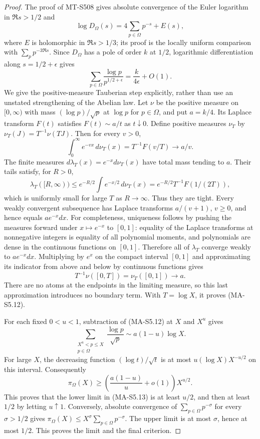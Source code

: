 \begin{proof}
The proof of MT-S508 gives absolute convergence of the Euler
logarithm in $\Re s>1/2$ and
\[
 \log D_\Omega(s)=4\sum_{p\in\Omega}p^{-s}+E(s),
\]
where $E$ is holomorphic in $\Re s>1/3$; its proof is the
locally uniform comparison with $\sum_p p^{-3\Re s}$. Since
$D_\Omega$ has a pole of order $k$ at $1/2$, logarithmic
differentiation along $s=1/2+\epsilon$ gives
\[
 \sum_{p\in\Omega}\frac{\log p}{p^{1/2+\epsilon}}
                  =\frac{k}{4\epsilon}+O(1).
 \tag{MA-S5.14}
\]
We give the positive-measure Tauberian step explicitly, rather
than use an unstated strengthening of the Abelian law.
Let $\nu$ be the positive measure on $[0,\infty)$ with mass
$(\log p)/\sqrt p$ at $\log p$ for $p\in\Omega$, and put
$a=k/4$. Its Laplace transform $F(t)$ satisfies
$F(t)\sim a/t$ as $t\downarrow0$. Define positive measures
$\nu_T$ by $\nu_T(J)=T^{-1}\nu(TJ)$. Then for every $v>0$,
\[
       \int_0^\infty e^{-v x}\,d\nu_T(x)
            =T^{-1}F(v/T)\longrightarrow a/v.
\]
The finite measures $d\lambda_T(x)=e^{-x}d\nu_T(x)$ have
total mass tending to $a$. Their tails satisfy, for $R>0$,
\[
 \lambda_T([R,\infty))
   \le e^{-R/2}\int e^{-x/2}\,d\nu_T(x)
   =e^{-R/2}T^{-1}F(1/(2T)),
\]
which is uniformly small for large $T$ as $R\to\infty$.
Thus they are tight. Every weakly convergent subsequence has
Laplace transforms $a/(v+1)$, $v\ge0$, and hence equals
$a e^{-x}dx$. For completeness, uniqueness follows by pushing
the measures forward under $x\mapsto e^{-x}$ to $[0,1]$:
equality of the Laplace transforms at nonnegative integers is
equality of all polynomial moments, and polynomials are dense
in the continuous functions on $[0,1]$. Therefore all of
$\lambda_T$ converge weakly to $a e^{-x}dx$.
Multiplying by $e^x$ on the compact interval $[0,1]$ and
approximating its indicator from above and below by continuous
functions gives
\[
           T^{-1}\nu([0,T])=\nu_T([0,1])\longrightarrow a.
\]
There are no atoms at the endpoints in the limiting measure,
so this last approximation introduces no boundary term. With
$T=\log X$, it proves (MA-S5.12).

For each fixed $0<u<1$, subtraction of (MA-S5.12) at $X$ and
$X^u$ gives
\[
 \sum_{\substack{X^u<p\le X\\p\in\Omega}}
       \frac{\log p}{\sqrt p}
              \sim a(1-u)\log X.
\]
For large $X$, the decreasing function $(\log t)/\sqrt t$
is at most $u(\log X)X^{-u/2}$ on this interval. Consequently
\[
 \pi_\Omega(X)\ge
     \left(\frac{a(1-u)}u+o(1)\right)X^{u/2}.
\]
This proves that the lower limit in (MA-S5.13) is at least
$u/2$, and then at least $1/2$ by letting $u\uparrow1$.
Conversely, absolute convergence of
$\sum_{p\in\Omega}p^{-\sigma}$ for every $\sigma>1/2$
gives $\pi_\Omega(X)\le X^\sigma\sum_{p\in\Omega}p^{-\sigma}$.
The upper limit is at most $\sigma$, hence at most $1/2$.
This proves the limit and the final criterion.
\end{proof}

